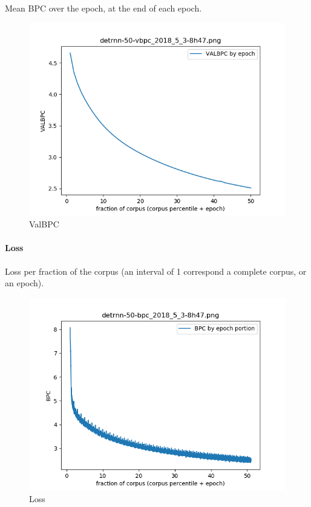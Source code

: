 Mean BPC over the epoch, at the end of each epoch.

\begin{figure}[ht]
\centering
\includegraphics{parts/appendix/reports-gmsnn/docs_esteban-latex/test_reports/detrnn-50/detrnn-50-vbpc_2018_5_3-8h47.png}
\caption{ValBPC}
\end{figure}

\newpage
\paragraph{Loss}

Loss per fraction of the corpus (an interval of 1 correspond a complete
corpus, or an epoch).

\begin{figure}[ht]
\centering
\includegraphics{parts/appendix/reports-gmsnn/docs_esteban-latex/test_reports/detrnn-50/detrnn-50-bpc_2018_5_3-8h47.png}
\caption{Loss}
\end{figure}

